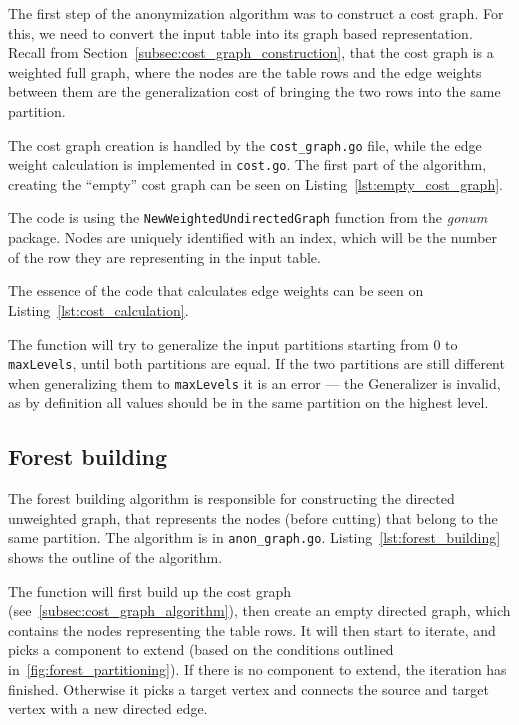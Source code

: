 The first step of the anonymization algorithm was to construct a cost graph. For this, we need to convert the input table into its graph based representation. Recall from Section~\ref{subsec:cost_graph_construction}, that the cost graph is a weighted full graph, where the nodes are the table rows and the edge weights between them are the generalization cost of bringing the two rows into the same partition.

The cost graph creation is handled by the \texttt{cost\_graph.go} file, while the edge weight calculation is implemented in \texttt{cost.go}.
The first part of the algorithm, creating the ``empty'' cost graph can be seen on Listing~\ref{lst:empty_cost_graph}.



The code is using the \texttt{NewWeightedUndirectedGraph} function from the \emph{gonum} package. Nodes are uniquely identified with an index, which will be the number of the row they are representing in the input table.

The essence of the code that calculates edge weights can be seen on Listing~\ref{lst:cost_calculation}.

The function will try to generalize the input partitions starting from 0 to \texttt{maxLevels}, until both partitions are equal. If the two partitions are still different when generalizing them to \texttt{maxLevels} it is an error --- the Generalizer is invalid, as by definition all values should be in the same partition on the highest level.



\subsection{Forest building}

The forest building algorithm is responsible for constructing the directed unweighted graph, that represents the nodes (before cutting) that belong to the same partition. The algorithm is in \texttt{anon\_graph.go}. Listing~\ref{lst:forest_building} shows the outline of the algorithm.



The function will first build up the cost graph (see~\ref{subsec:cost_graph_algorithm}), then create an empty directed graph, which contains the nodes representing the table rows. It will then start to iterate, and picks a component to extend (based on the conditions outlined in~\ref{fig:forest_partitioning}). If there is no component to extend, the iteration has finished. Otherwise it picks a target vertex and connects the source and target vertex with a new directed edge.

